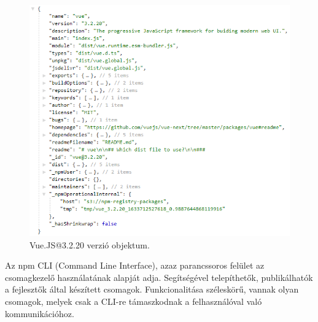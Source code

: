 \begin{flushright}
	\cite{npm-registry-item}
\end{flushright}

\begin{figure}[h]
	\centering
	\includegraphics[scale=0.5]{images/registry_vue_version.png}
	\caption{Vue.JS@3.2.20 verzió objektum.}
	\label{fig:registry-vue-version}
\end{figure}

\pagebreak


Az npm CLI (Command Line Interface), azaz parancssoros felület az csomagkezelő használatának alapját adja. Segítségével telepíthetők, publikálhatók a fejlesztők által készített csomagok. Funkcionalitása széleskörű, vannak olyan csomagok, melyek csak a CLI-re támaszkodnak a felhasználóval való kommunikációhoz.

